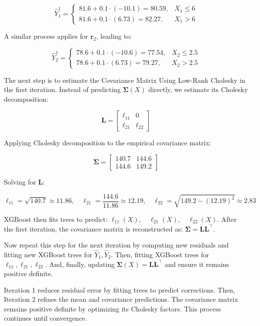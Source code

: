 \[
\hat{Y}_1^1 =
\begin{cases}
81.6 + 0.1 \cdot (-10.1) = 80.59, & X_1 \leq 6 \\
81.6 + 0.1 \cdot (6.73) = 82.27, & X_1 > 6
\end{cases}
\]

\noindent A similar process applies for \( \mathbf{r}_2 \), leading to:

\[
\hat{Y}_2^1 =
\begin{cases}
78.6 + 0.1 \cdot (-10.6) = 77.54, & X_2 \leq 2.5 \\
78.6 + 0.1 \cdot (6.73) = 79.27, & X_2 > 2.5
\end{cases}
\]

\noindent The next step is to estimate the Covariance Matrix Using Low-Rank Cholesky in the first iteration. Instead of predicting \( \mathbf{\Sigma}(X) \) directly, we estimate its Cholesky decomposition:

\[
\mathbf{L} =
\begin{bmatrix}
\ell_{11} & 0 \\
\ell_{21} & \ell_{22}
\end{bmatrix}
\]

\noindent Applying Cholesky decomposition to the empirical covariance matrix:

\[
\mathbf{\Sigma} =
\begin{bmatrix}
140.7 & 144.6 \\
144.6 & 149.2
\end{bmatrix}
\]

\noindent Solving for \( \mathbf{L} \):

\[
\ell_{11} = \sqrt{140.7} \approx 11.86, \quad
\ell_{21} = \frac{144.6}{11.86} \approx 12.19, \quad
\ell_{22} = \sqrt{149.2 - (12.19)^2} \approx 2.83
\]

\noindent XGBoost then fits trees to predict: $\ell_{11}(X), \quad \ell_{21}(X), \quad \ell_{22}(X)$. After the first iteration, the covariance matrix is reconstructed as: $\mathbf{\Sigma} = \mathbf{L} \mathbf{L}^\top$.

\noindent Now repeat this step for the next iteration by computing new residuals and fitting new XGBoost trees for \( \hat{Y}_1, \hat{Y}_2 \). Then, fitting XGBoost trees for \( \ell_{11}, \ell_{21}, \ell_{22} \). And, finally, updating \( \mathbf{\Sigma}(X) = \mathbf{L} \mathbf{L}^\top \) and ensure it remains positive definite.

Iteration 1 reduces residual error by fitting trees to predict corrections.
Then, Iteration 2 refines the mean and covariance predictions. The covariance matrix remains positive definite by optimizing its Cholesky factors.
This process continues until convergence. 


